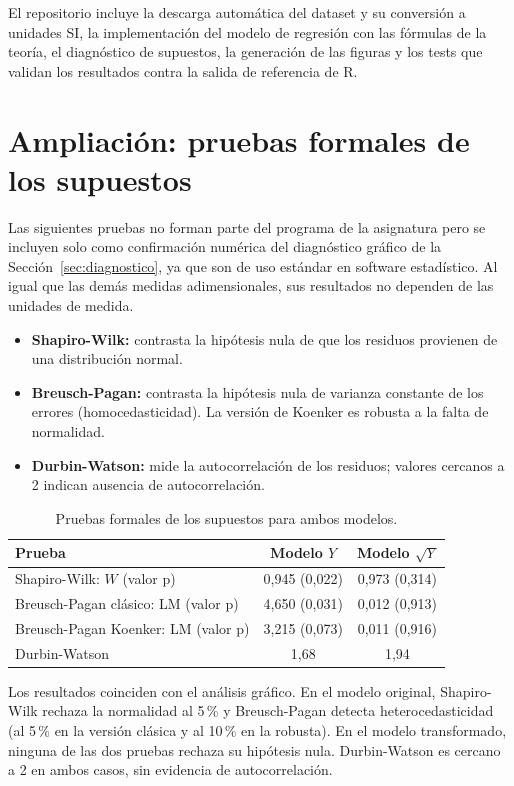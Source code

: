 \documentclass[12pt,a4paper]{article}
\begin{document}
\begin{center}
\repourl
\end{center}

El repositorio incluye la descarga automática del dataset y su conversión a unidades SI, la implementación del modelo de regresión con las fórmulas de la teoría, el diagnóstico de supuestos, la generación de las figuras y los tests que validan los resultados contra la salida de referencia de R.

\section{Ampliación: pruebas formales de los supuestos}
\label{sec:ampliacion}

Las siguientes pruebas no forman parte del programa de la asignatura pero se incluyen solo como confirmación numérica del diagnóstico gráfico de la Sección~\ref{sec:diagnostico}, ya que son de uso estándar en software estadístico. Al igual que las demás medidas adimensionales, sus resultados no dependen de las unidades de medida.

\begin{itemize}[leftmargin=*]
  \item \textbf{Shapiro-Wilk:} contrasta la hipótesis nula de que los residuos provienen de una distribución normal.
  \item \textbf{Breusch-Pagan:} contrasta la hipótesis nula de varianza constante de los errores (homocedasticidad). La versión de Koenker es robusta a la falta de normalidad.
  \item \textbf{Durbin-Watson:} mide la autocorrelación de los residuos; valores cercanos a 2 indican ausencia de autocorrelación.
\end{itemize}

\begin{table}[H]
\centering
\caption{Pruebas formales de los supuestos para ambos modelos.}
\begin{tabular}{lcc}
\toprule
\textbf{Prueba} & \textbf{Modelo $Y$} & \textbf{Modelo $\sqrt{Y}$} \\
\midrule
Shapiro-Wilk: $W$ (valor p) & 0{,}945 (0{,}022) & 0{,}973 (0{,}314) \\
Breusch-Pagan clásico: LM (valor p) & 4{,}650 (0{,}031) & 0{,}012 (0{,}913) \\
Breusch-Pagan Koenker: LM (valor p) & 3{,}215 (0{,}073) & 0{,}011 (0{,}916) \\
Durbin-Watson & 1{,}68 & 1{,}94 \\
\bottomrule
\end{tabular}
\end{table}

Los resultados coinciden con el análisis gráfico. En el modelo original, Shapiro-Wilk rechaza la normalidad al 5\,\% y Breusch-Pagan detecta heterocedasticidad (al 5\,\% en la versión clásica y al 10\,\% en la robusta). En el modelo transformado, ninguna de las dos pruebas rechaza su hipótesis nula. Durbin-Watson es cercano a 2 en ambos casos, sin evidencia de autocorrelación.
\end{document}
